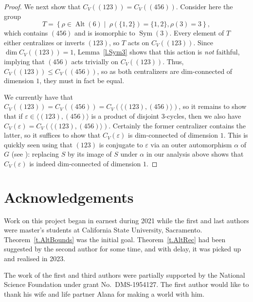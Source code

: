 \documentclass[a4paper, 11pt]{amsart}
\theoremstyle{plain}
\theoremstyle{definition}
\theoremstyle{remark}
\DeclareMathOperator{\Sym}{Sym}
\DeclareMathOperator{\Alt}{Alt}
\begin{document}
\begin{proof}
We next show that $C_V((123)) = C_V((456))$. Consider here the group \[T=\left\{ \rho\in\Alt(6)\mid \ \rho\left(\{1,2\}\right) = \{1,2\}, \rho(3) = 3\right\},\]
which contains $(456)$ and is isomorphic to $\Sym(3)$. Every element of $T$ either centralizes or inverts $(123)$, so $T$ acts on $C_V((123))$. Since $\dim C_V((123)) = 1$, Lemma~\ref{l.Sym3} shows that this action is \emph{not} faithful, implying that $(456)$ acts trivially on $C_V((123))$. Thus, $C_V((123)) \le C_V((456))$, so as both centralizers are dim-connected of dimension $1$, they must in fact be equal.

We currently have that $C_V((123)) = C_V((456)) = C_V(\langle (123),(456)\rangle)$, so it remains to show that if $\varepsilon \in \langle (123),(456)\rangle$ is a product of  disjoint $3$-cycles, then we also have $C_V(\varepsilon) = C_V(\langle (123),(456)\rangle)$. Certainly the former centralizer contains the latter, so it suffices to show that $C_V(\varepsilon)$ is dim-connected of dimension $1$. This is quickly seen using that $(123)$ is  conjugate to $\varepsilon$ via an outer automorphism $\alpha$ of $G$ (see \cite{JR82}): replacing $S$ by its image of $S$ under $\alpha$ in our analysis above shows that $C_V(\varepsilon)$ is indeed dim-connected of dimension $1$.
\end{proof}



\section*{Acknowledgements}
Work on this project began in earnest during 2021 while the first and last authors were master's  students at California State University, Sacramento. Theorem~\ref{t.AltBounds} was the initial goal. Theorem~\ref{t.AltRec} had been suggested by the second author for some time, and with delay, it was picked up and realised in 2023. 

The work of the first and third authors were partially supported by the National Science Foundation under grant No.~DMS-1954127. The first author would like to thank his wife and life partner Alana for making a world with him.




\end{document}
